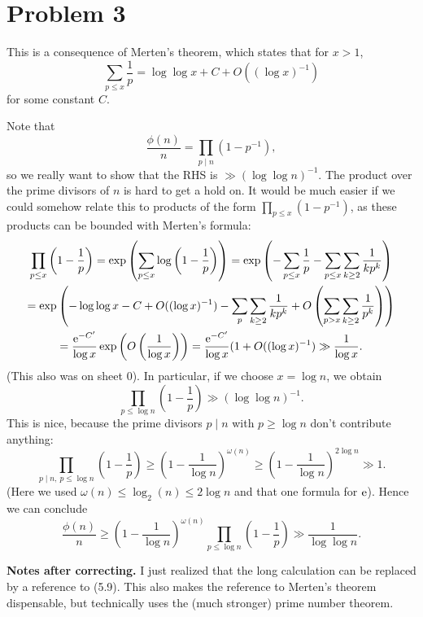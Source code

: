 \documentclass[a4paper,11pt]{article}
\begin{document}
\section*{Problem 3}
This is a consequence of Merten's theorem, which states that for 
$x > 1$, 
\[
    \sum_{p \leq x} \frac 1p = \log \log x + C + O((\log x)^{-1})
\]
for some constant $C$. 

Note that 
\[
    \frac{\phi(n)}n = \prod_{p \mid n} (1 - p^{-1}),
\]
so we really want to show that the RHS is $\gg (\log \log n)^{-1}$. 
The product over the prime divisors of $n$ is hard to get a hold on. 
It would be much easier if we could somehow relate this to products of 
the form $\prod_{p \leq x} (1-p^{-1})$, as these products can be bounded
with Merten's formula:
\begin{multline*}
    \prod_{p \leq x} \left(1 - \frac 1p \right) 
    = \exp \left( \sum_{p \leq x} \log \left( 1- \frac 1p \right) \right) = \exp \left( - \sum_{p \leq x} \frac 1p - \sum_{p \leq x} \sum_{k \geq 2} \frac1{kp^k} \right) \\ 
    = \exp\left( - \log \log x -C + O((\log x)^{-1}) - \sum_p \sum_{k \geq 2} \frac1{kp^k} + O\left( \sum_{p > x} \sum_{k \geq 2} \frac1 {p^k} \right) \right) \\ 
    = \frac{ \mathrm e^{-C'}}{\log x} \exp \left( O \left( \frac 1{\log x} \right) \right) 
    = \frac{\mathrm e^{-C'}}{\log x}(1 + O((\log x)^{-1}) 
    \gg \frac 1{\log x}.
\end{multline*}
(This also was on sheet 0). 
In particular, if we choose $x = \log n$, we obtain
\[
    \prod_{p \leq \log n}\left(1 - \frac 1p\right) \gg (\log \log n)^{-1}.
\]
This is nice, because the prime divisors $p \mid n$ with $p \geq \log n$ 
don't contribute anything: 
\[
    \prod_{p \mid n, \ p \leq \log n} \left(1 - \frac 1p\right)
    \geq \left( 1 - \frac 1 {\log n} \right)^{\omega(n)}
    \geq \left(1 - \frac 1 {\log n} \right)^{2 \log n} \gg 1.
\]
(Here we used $\omega(n) \leq \log_2(n) \leq 2 \log n$ and that one formula for $\mathrm e$). Hence we can conclude
\[
    \frac{\phi(n)}n \geq
    \left( 1 - \frac 1{\log n} \right)^{\omega(n)} \prod_{p \leq \log n}
    \left(1 - \frac 1p\right) \gg \frac 1{\log \log n}.
\]

\textbf{Notes after correcting.} I just realized that the long calculation 
can be replaced by a reference to (5.9). This also makes the reference to 
Merten's theorem dispensable, but technically uses the (much stronger) 
prime number theorem.
\end{document}
